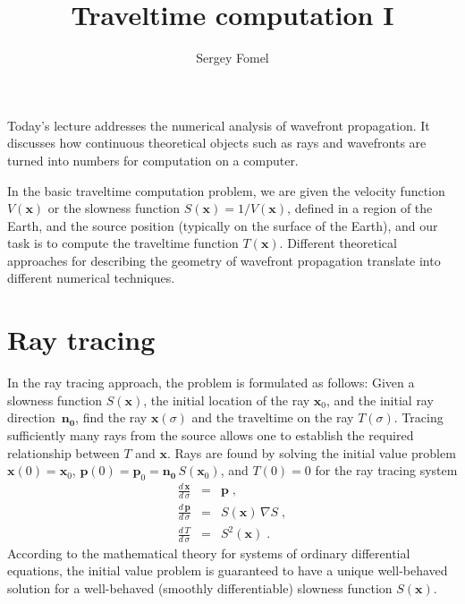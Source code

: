 
%

\author{Sergey Fomel}
\title{Traveltime computation I}

\maketitle

Today's lecture addresses the numerical analysis of wavefront propagation. It
discusses how continuous theoretical objects such as rays and
wavefronts are turned into numbers for computation on a computer.

In the basic traveltime computation problem, we are given the velocity
function $V(\mathbf{x})$ or the slowness function
$S(\mathbf{x})=1/V(\mathbf{x})$, defined in a region of the Earth, and the
source position (typically on the surface of the Earth), and our task is to
compute the traveltime function $T(\mathbf{x})$. Different theoretical
approaches for describing the geometry of wavefront propagation translate into
different numerical techniques.

\section{Ray tracing}

In the ray tracing approach, the problem is formulated as follows:
Given a slowness function $S(\mathbf{x})$, the initial location of the
ray $\mathbf{x}_0$, and the initial ray direction~$\mathbf{n_0}$, find
the ray $\mathbf{x}(\sigma)$ and the traveltime on the ray
$T(\sigma)$. Tracing sufficiently many rays from the source allows one
to establish the required relationship between $T$ and
$\mathbf{x}$. Rays are found by solving the initial value problem
$\mathbf{x}(0)=\mathbf{x}_0$, $\mathbf{p}(0)=\mathbf{p}_0 =
\mathbf{n_0}\,S(\mathbf{x}_0)$, and $T(0) = 0$ for the ray tracing system
\begin{eqnarray}
  \label{eq:xray}
  \frac{d\,\mathbf{x}}{d\,\sigma} & = & \mathbf{p}\;, \\
  \label{eq:pray}
  \frac{d\,\mathbf{p}}{d\,\sigma} & = & S(\mathbf{x})\,\nabla S\;, \\
  \label{eq:tray}
  \frac{d\,T}{d\,\sigma} & = & S^2(\mathbf{x})\;.
\end{eqnarray}
According to the mathematical theory for systems of ordinary
differential equations, the initial value problem is guaranteed to
have a unique well-behaved solution for a well-behaved (smoothly
differentiable) slowness function $S(\mathbf{x})$.

